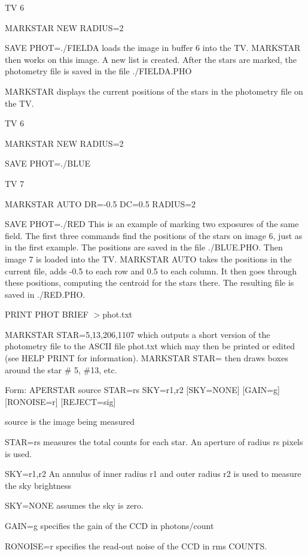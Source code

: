 {\newpage\clearpage
{}%
\begin{example}
  \item[TV 6\hfill]{}
  \item[MARKSTAR NEW RADIUS=2\hfill]{}
  \item[SAVE PHOT=./FIELDA\hfill]{
loads the image in buffer 6 into the TV.  MARKSTAR
then works on this image.  A new list is created.
After the stars are marked, the photometry file is
saved in the file ./FIELDA.PHO}
  \item[MARKSTAR\hfill]{
displays the current positions of the stars in the
photometry file on the TV.}
  \item[TV 6 \hfill]{}
  \item[MARKSTAR NEW RADIUS=2\hfill]{}
  \item[SAVE PHOT=./BLUE\hfill]{}
  \item[TV 7\hfill]{}
  \item[MARKSTAR AUTO DR=-0.5 DC=0.5 RADIUS=2\hfill]{}
  \item[SAVE PHOT=./RED\hfill]{ This is an example of marking two exposures
       of the same field.  The first three commands find the positions of
       the stars on image 6, just as in the first example.  The positions
       are saved in the file ./BLUE.PHO.  Then image 7 is loaded into the
       TV.  MARKSTAR AUTO takes the positions in the current file, adds
       -0.5 to each row and 0.5 to each column. It then goes through these
       positions, computing the centroid for the stars there.  The
       resulting file is saved in ./RED.PHO.}
\par
\item[PRINT PHOT BRIEF $>$phot.txt\hfill]{}
\par
\item[MARKSTAR STAR=5,13,206,1107\hfill]{ which outputs a short version
       of the photometry file to the ASCII file phot.txt which may then be
       printed or edited (see HELP PRINT for information).  MARKSTAR STAR=
       then draws boxes around the star \# 5, \#13, etc.}
\end{example}%
\lthtmlfigureZ
\lthtmlcheckvsize\clearpage}

{\newpage\clearpage
{}%
\begin{command}
  \item[Form: APERSTAR source STAR=rs SKY=r1,r2 {[SKY=NONE]} {[GAIN=g]} {[RONOISE=r]} {[REJECT=sig]}\hfill]{}
  \item[source]{is the image being measured}
  \item[STAR=rs]{measures the total counts for each star.
An aperture of radius rs pixels is used.}
  \item[SKY=r1,r2]{An annulus of inner radius r1 and outer
radius r2 is used to measure the sky brightness}
  \item[SKY=NONE]{assumes the sky is zero.}
  \item[GAIN=g]{specifies the gain of the CCD in photons/count}
  \item[RONOISE=r]{specifies the read-out noise of the CCD in rms COUNTS.}
\end{command}%
\lthtmlfigureZ
\lthtmlcheckvsize\clearpage}

